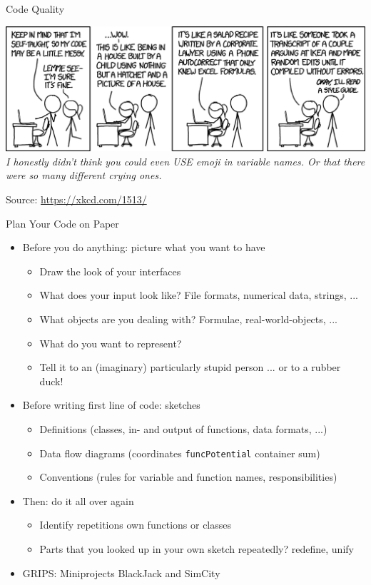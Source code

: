 \begin{frame}{Code Quality}
%
\begin{center}
	\includegraphics[width=\linewidth]{./gfx/codeQuality}\\
	\emph{I honestly didn't think you could even USE emoji in variable names. Or that there were so many different crying ones.}

	\vspace{6pt}
	Source: \url{https://xkcd.com/1513/}
\end{center}
%
\end{frame}


\begin{frame}{Plan Your Code on Paper}
%
\begin{itemize}
\item Before you do anything: picture what you want to have
	\begin{itemize}
	\item Draw the look of your interfaces
	\item What does your input look like? File formats, numerical data, strings, ...
	\item What objects are you dealing with? Formulae, real-world-objects, ...
	\item What do you want to represent?
	\item Tell it to an (imaginary) particularly stupid person ... or to a rubber duck!
	\end{itemize}
\item Before writing first line of code: sketches
	\begin{itemize}
	\item Definitions (classes, in- and output of functions, data formats, ...)
	\item Data flow diagrams (\eg coordinates \thus\; \texttt{funcPotential} \thus\; container \thus\; sum)
	\item Conventions (rules for variable and function names, responsibilities)
	\end{itemize}
\item Then: do it all over again
	\begin{itemize}
	\item Identify repetitions \thus\; own functions or classes
	\item Parts that you looked up in your own sketch repeatedly? \thus\; redefine, unify
	\end{itemize}
\item GRIPS: Miniprojects BlackJack and SimCity
\end{itemize}
%
\end{frame}

